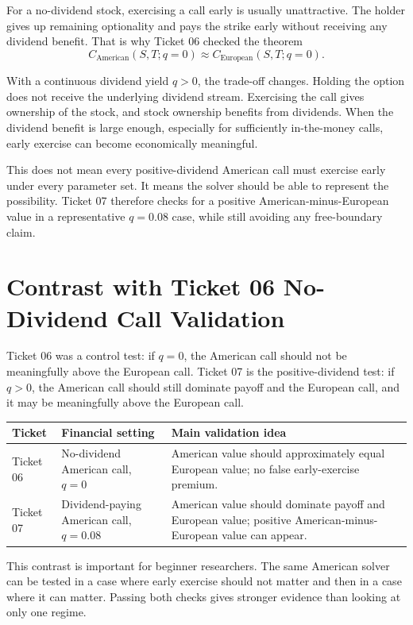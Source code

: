 \documentclass[11pt,a4paper]{article}
\begin{document}
For a no-dividend stock, exercising a call early is usually unattractive. The holder gives up
remaining optionality and pays the strike early without receiving any dividend benefit. That is
why Ticket 06 checked the theorem
\begin{equation}
  C_{\mathrm{American}}(S,T;q=0) \approx C_{\mathrm{European}}(S,T;q=0).
\end{equation}

With a continuous dividend yield \(q>0\), the trade-off changes. Holding the option does not
receive the underlying dividend stream. Exercising the call gives ownership of the stock, and
stock ownership benefits from dividends. When the dividend benefit is large enough, especially
for sufficiently in-the-money calls, early exercise can become economically meaningful.

This does not mean every positive-dividend American call must exercise early under every
parameter set. It means the solver should be able to represent the possibility. Ticket 07
therefore checks for a positive American-minus-European value in a representative \(q=0.08\)
case, while still avoiding any free-boundary claim.

\section{Contrast with Ticket 06 No-Dividend Call Validation}

Ticket 06 was a control test: if \(q=0\), the American call should not be meaningfully above the
European call. Ticket 07 is the positive-dividend test: if \(q>0\), the American call should
still dominate payoff and the European call, and it may be meaningfully above the European call.

\begin{longtable}{L{0.23\textwidth}L{0.31\textwidth}L{0.34\textwidth}}
\toprule
Ticket & Financial setting & Main validation idea \\
\midrule
\endhead
Ticket 06 & No-dividend American call, \(q=0\) &
American value should approximately equal European value; no false early-exercise premium. \\
Ticket 07 & Dividend-paying American call, \(q=0.08\) &
American value should dominate payoff and European value; positive American-minus-European value
can appear. \\
\bottomrule
\end{longtable}

This contrast is important for beginner researchers. The same American solver can be tested in a
case where early exercise should not matter and then in a case where it can matter. Passing both
checks gives stronger evidence than looking at only one regime.
\end{document}
